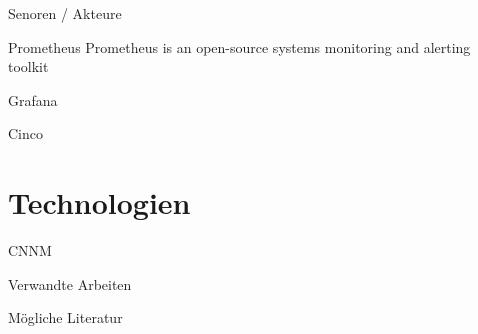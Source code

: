 \documentclass[12pt, pdf, xcolor={table, dvipsnames}, paperheight=8cm,paperwidth=12cm]{beamer}
\begin{document}
\begin{frame}{Senoren / Akteure}
	
\end{frame}

\begin{frame}{Prometheus}
	Prometheus is an open-source systems monitoring and alerting toolkit
\end{frame}

\begin{frame}{Grafana}
\end{frame}

\begin{frame}{Cinco}
\end{frame}

\section{Technologien}
\begin{frame}{CNNM}
\end{frame}



\begin{frame}{Verwandte Arbeiten}
\end{frame}

\begin{frame}{Mögliche Literatur}
\end{frame}
\end{document}
